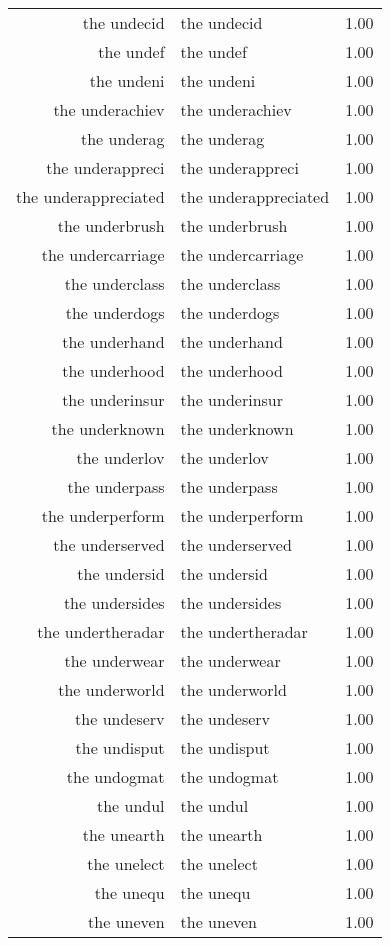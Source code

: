 \begin{table}[ht]
\begin{tabular}{rlr}
  the undecid & the undecid & 1.00 \\ 
  the undef & the undef & 1.00 \\ 
  the undeni & the undeni & 1.00 \\ 
  the underachiev & the underachiev & 1.00 \\ 
  the underag & the underag & 1.00 \\ 
  the underappreci & the underappreci & 1.00 \\ 
  the underappreciated & the underappreciated & 1.00 \\ 
  the underbrush & the underbrush & 1.00 \\ 
  the undercarriage & the undercarriage & 1.00 \\ 
  the underclass & the underclass & 1.00 \\ 
  the underdogs & the underdogs & 1.00 \\ 
  the underhand & the underhand & 1.00 \\ 
  the underhood & the underhood & 1.00 \\ 
  the underinsur & the underinsur & 1.00 \\ 
  the underknown & the underknown & 1.00 \\ 
  the underlov & the underlov & 1.00 \\ 
  the underpass & the underpass & 1.00 \\ 
  the underperform & the underperform & 1.00 \\ 
  the underserved & the underserved & 1.00 \\ 
  the undersid & the undersid & 1.00 \\ 
  the undersides & the undersides & 1.00 \\ 
  the undertheradar & the undertheradar & 1.00 \\ 
  the underwear & the underwear & 1.00 \\ 
  the underworld & the underworld & 1.00 \\ 
  the undeserv & the undeserv & 1.00 \\ 
  the undisput & the undisput & 1.00 \\ 
  the undogmat & the undogmat & 1.00 \\ 
  the undul & the undul & 1.00 \\ 
  the unearth & the unearth & 1.00 \\ 
  the unelect & the unelect & 1.00 \\ 
  the unequ & the unequ & 1.00 \\ 
  the uneven & the uneven & 1.00 \\ 

\end{tabular}
\end{table}
